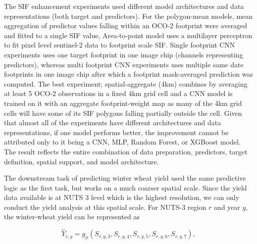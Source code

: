 The SIF enhancement experiments used different model architectures and data representations (both target and predictors). For the polygon-mean models, mean aggregation of predictor values falling within an OCO-2 footprint were averaged and fitted to a single SIF value, Area-to-point model uses a multilayer perceptron to fit pixel level sentinel-2 data to footprint scale SIF. Single footprint CNN experiments uses one target footprint in one image chip (channels representing predictors), whereas multi footprint CNN experiments uses multiple same date footprints in one image chip after  which a footprint mask-averaged prediction was computed. The best experiment; spatial-aggregate (4km) combines by averaging at least 5 OCO-2 observations in a fixed 4km grid cell and a CNN model is trained on it with an aggregate footprint-weight map as many of the 4km grid cells will have some of its SIF polygons falling partially outside the cell. Given that almost all of the experiments have different architectures and data representations, if one model performs better, the improvement cannot be attributed only to it being a CNN, MLP, Random Forest, or XGBoost model. The result reflects the entire combination of data preparation, predictors, target definition, spatial support, and model architecture.

The downstream task of predicting winter wheat yield used the same predictive logic as the first task, but works on a much coarser spatial scale. Since the yield data available is at NUTS 3 level which is the highest resolution, we can only conduct the yield analysis at this spatial scale. For NUTS-3 region $r$ and year $y$, the winter-wheat yield can be represented as

\begin{equation}
    \widehat{Y}_{r,y} = g_{\phi}\!\left(S_{r,y,3},S_{r,y,4},S_{r,y,5},S_{r,y,6},S_{r,y,7}\right),
    \label{eq:yield_design}
\end{equation}

